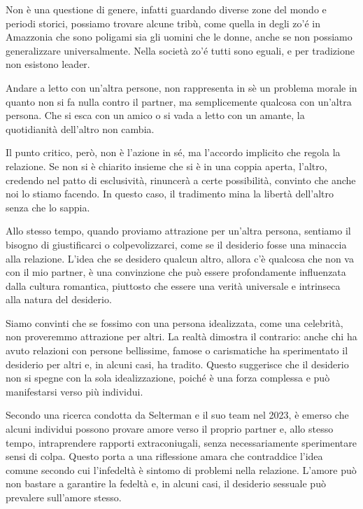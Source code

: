 \documentclass[12pt]{book} %
\begin{document}
Non è una questione di genere, infatti guardando diverse zone del mondo e periodi storici, possiamo trovare alcune tribù, come quella in degli zo'é in Amazzonia che sono poligami sia gli uomini che le donne, anche se non possiamo generalizzare universalmente. Nella società zo'é tutti sono eguali, e per tradizione non esistono leader.

Andare a letto con un'altra persone, non rappresenta in sè un problema morale in quanto non si fa nulla contro il partner, ma semplicemente qualcosa con un’altra persona. Che si esca con un amico o si vada a letto con un amante, la quotidianità dell’altro non cambia.

Il punto critico, però, non è l’azione in sé, ma l’accordo implicito che regola la relazione. Se non si è chiarito insieme che si è in una coppia aperta, l'altro, credendo nel patto di esclusività, rinuncerà a certe possibilità, convinto che anche noi lo stiamo facendo. In questo caso, il tradimento mina la libertà dell’altro senza che lo sappia.

Allo stesso tempo, quando proviamo attrazione per un’altra persona, sentiamo il bisogno di giustificarci o colpevolizzarci, come se il desiderio fosse una minaccia alla relazione. L'idea che se desidero qualcun altro, allora c'è qualcosa che non va con il mio partner, è una convinzione che può essere profondamente influenzata dalla cultura romantica, piuttosto che essere una verità universale e intrinseca alla natura del desiderio.

Siamo convinti che se fossimo con una persona idealizzata, come una celebrità, non proveremmo attrazione per altri. La realtà dimostra il contrario: anche chi ha avuto relazioni con persone bellissime, famose o carismatiche ha sperimentato il desiderio per altri e, in alcuni casi, ha tradito. Questo suggerisce che il desiderio non si spegne con la sola idealizzazione, poiché è una forza complessa e può manifestarsi verso più individui.

Secondo una ricerca condotta da Selterman e il suo team nel 2023, è emerso che alcuni individui possono provare amore verso il proprio partner e, allo stesso tempo, intraprendere rapporti extraconiugali, senza necessariamente sperimentare sensi di colpa. Questo porta a una riflessione amara che contraddice l'idea comune secondo cui l'infedeltà è sintomo di problemi nella relazione. L'amore può non bastare a garantire la fedeltà e, in alcuni casi, il desiderio sessuale può prevalere sull'amore stesso.
\end{document}
